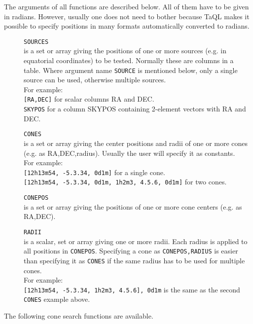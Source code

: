 The arguments of all functions are described below. All of them have
to be given in radians. However, usually one does not need to bother
because TaQL makes it possible
to specify positions in many formats automatically converted
to radians.
\begin{description}
  \item[] \texttt{SOURCES}\\
       is a set or array giving the positions of one or more
       sources (e.g. in equatorial coordinates)
       to be tested. Normally these are columns in a table.
       Where argument name \texttt{SOURCE} is mentioned below, only a
       single source can be used, otherwise multiple sources.
       \\For example:
       \\\texttt{[RA,DEC]} for scalar columns RA and DEC.
       \\\texttt{SKYPOS} for a column SKYPOS containing 2-element
       vectors with RA and DEC.
  \item[] \texttt{CONES}\\
       is a set or array giving the center positions and radii of
       one or more cones (e.g. as RA,DEC,radius).
       Usually the user will specify it as constants.
       \\For example:
       \\\texttt{[12h13m54, -5.3.34, 0d1m]} for a single cone.
       \\\texttt{[12h13m54, -5.3.34, 0d1m, 1h2m3, 4.5.6, 0d1m]} for two cones.
  \item[] \texttt{CONEPOS}\\
       is a set or array giving the positions of one or more
       cone centers (e.g. as RA,DEC).
  \item[] \texttt{RADII}\\
       is a scalar, set or array giving one or more radii.
       Each radius is applied to all positions in \texttt{CONEPOS}.
       Specifying a cone as \texttt{CONEPOS,RADIUS} is easier than specifying
       it as \texttt{CONES} if the same radius has to be used for
       multiple cones.
       \\For example:
       \\\texttt{[12h13m54, -5.3.34, 1h2m3, 4.5.6], 0d1m} is the same
       as the second \texttt{CONES} example above.
\end{description}
The following cone search functions are available.
